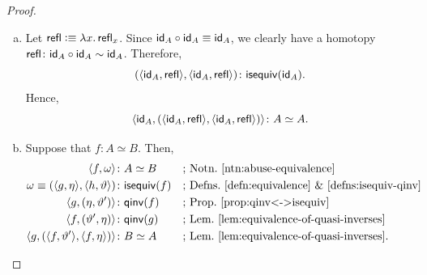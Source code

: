 \begin{proof}${}$
    \begin{enumerate}[a)]
        \item Let\/ $\mathsf{refl} \mathrel{\vcentcolon}\equiv \lambda x.\,\mathsf{refl}_x$. Since\/ $\mathsf{id}_A \circ \mathsf{id}_A \equiv \mathsf{id}_A$, we clearly have a homotopy\/ $\fun{refl}\colon \id_A\circ\id_A\sim\id_A$.
        Therefore,
        \[
            (\dep{\id_A,\fun{refl}},\dep{\id_A,\fun{refl}})
                \colon\fun{isequiv}(\id_A).
        \]
        Hence,
        \[
            \dep{
                \id_A,
                (
                    \dep{\id_A,\fun{refl}},
                    \dep{\id_A,\fun{refl}}
                )
            }
            \colon A\simeq A.
        \]

        \item Suppose that $f\colon A\simeq B$. Then,
        \begin{align*}
            \dep{f,\omega}&\colon A\simeq B
                &&\text{; Notn.~\ref{ntn:abuse-equivalence}}\\
            \omega\equiv(\dep{g,\eta},\dep{h,\vartheta})
                &\colon\fun{isequiv}(f)
                &&\text{; Defns.~\ref{defn:equivalence} \& \ref{defns:isequiv-qinv}}\\
            \dep{g,(\eta,\vartheta')}&\colon\fun{qinv}(f)
                &&\text{; Prop.~\ref{prop:qinv<->isequiv}}\\
            \dep{f,(\vartheta',\eta)}&\colon\fun{qinv}(g)
                &&\text{; Lem.~\ref{lem:equivalence-of-quasi-inverses}}\\
            \dep{g,(\dep{f,\vartheta'},\dep{f,\eta})}
                &\colon B\simeq A
                &&\text{; Lem.~\ref{lem:equivalence-of-quasi-inverses}}.
        \end{align*}


\end{enumerate}
\end{proof}
